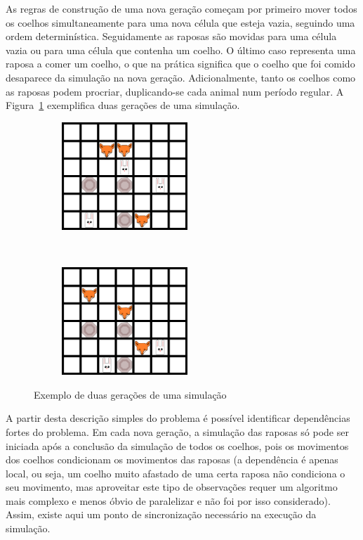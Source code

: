 \documentclass[10pt,a4paper,oneside]{article}
\begin{document}
As regras de construção de uma nova geração começam por primeiro mover
todos os coelhos simultaneamente para uma nova célula que esteja
vazia, seguindo uma ordem determinística. Seguidamente as raposas são
movidas para uma célula vazia ou para uma célula que contenha um
coelho. O último caso representa uma raposa a comer um coelho, o que
na prática significa que o coelho que foi comido desaparece da
simulação na nova geração. Adicionalmente, tanto os coelhos como as
raposas podem procriar, duplicando-se cada animal num período
regular. A Figura~\ref{fig:sim} exemplifica duas gerações de uma
simulação.

\begin{figure}[H]
    \centering
    \begin{subfigure}[b]{0.4\textwidth}
      \centering
      \includegraphics[height=1.6in]{grid1.png}
    \end{subfigure}
    ~
    \begin{subfigure}[b]{0.4\textwidth}
      \centering
      \includegraphics[height=1.6in]{grid2.png}
    \end{subfigure}
    \caption{Exemplo de duas gerações de uma simulação}
    \label{fig:sim}
\end{figure}

A partir desta descrição simples do problema é possível identificar
dependências fortes do problema. Em cada nova geração, a simulação das
raposas só pode ser iniciada após a conclusão da simulação de todos os
coelhos, pois os movimentos dos coelhos condicionam os movimentos das
raposas (a dependência é apenas local, ou seja, um coelho muito
afastado de uma certa raposa não condiciona o seu movimento, mas
aproveitar este tipo de observações requer um algoritmo mais complexo
e menos óbvio de paralelizar e não foi por isso considerado). Assim,
existe aqui um ponto de sincronização necessário na execução da
simulação.
\end{document}
